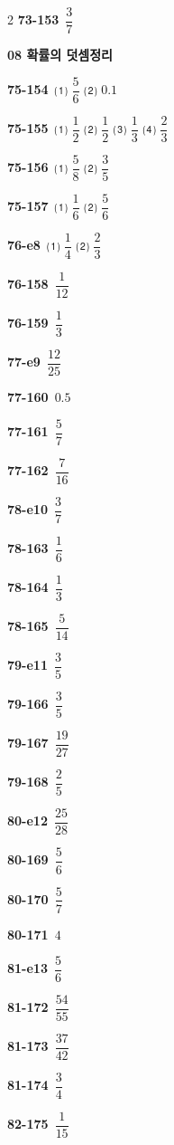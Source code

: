 \documentclass[10pt,a4paper]{article}
\begin{document}
\begin{multicols}{2}
\noindent\textbf{73-153}\ $\dfrac{3}{7}$\par
\noindent\textbf{08 확률의 덧셈정리}\par\smallskip
\noindent\textbf{75-154}\ ⑴ $\dfrac{5}{6}$ ⑵ $0.1$\par
\noindent\textbf{75-155}\ ⑴ $\dfrac{1}{2}$ ⑵ $\dfrac{1}{2}$ ⑶ $\dfrac{1}{3}$ ⑷ $\dfrac{2}{3}$\par
\noindent\textbf{75-156}\ ⑴ $\dfrac{5}{8}$ ⑵ $\dfrac{3}{5}$\par
\noindent\textbf{75-157}\ ⑴ $\dfrac{1}{6}$ ⑵ $\dfrac{5}{6}$\par
\noindent\textbf{76-e8}\ ⑴ $\dfrac{1}{4}$ ⑵ $\dfrac{2}{3}$\par
\noindent\textbf{76-158}\ $\dfrac{1}{12}$\par
\noindent\textbf{76-159}\ $\dfrac{1}{3}$\par
\noindent\textbf{77-e9}\ $\dfrac{12}{25}$\par
\noindent\textbf{77-160}\ $0.5$\par
\noindent\textbf{77-161}\ $\dfrac{5}{7}$\par
\noindent\textbf{77-162}\ $\dfrac{7}{16}$\par
\noindent\textbf{78-e10}\ $\dfrac{3}{7}$\par
\noindent\textbf{78-163}\ $\dfrac{1}{6}$\par
\noindent\textbf{78-164}\ $\dfrac{1}{3}$\par
\noindent\textbf{78-165}\ $\dfrac{5}{14}$\par
\noindent\textbf{79-e11}\ $\dfrac{3}{5}$\par
\noindent\textbf{79-166}\ $\dfrac{3}{5}$\par
\noindent\textbf{79-167}\ $\dfrac{19}{27}$\par
\noindent\textbf{79-168}\ $\dfrac{2}{5}$\par
\noindent\textbf{80-e12}\ $\dfrac{25}{28}$\par
\noindent\textbf{80-169}\ $\dfrac{5}{6}$\par
\noindent\textbf{80-170}\ $\dfrac{5}{7}$\par
\noindent\textbf{80-171}\ $4$\par
\noindent\textbf{81-e13}\ $\dfrac{5}{6}$\par
\noindent\textbf{81-172}\ $\dfrac{54}{55}$\par
\noindent\textbf{81-173}\ $\dfrac{37}{42}$\par
\noindent\textbf{81-174}\ $\dfrac{3}{4}$\par
\noindent\textbf{82-175}\ $\dfrac{1}{15}$\par

\end{multicols}
\end{document}
